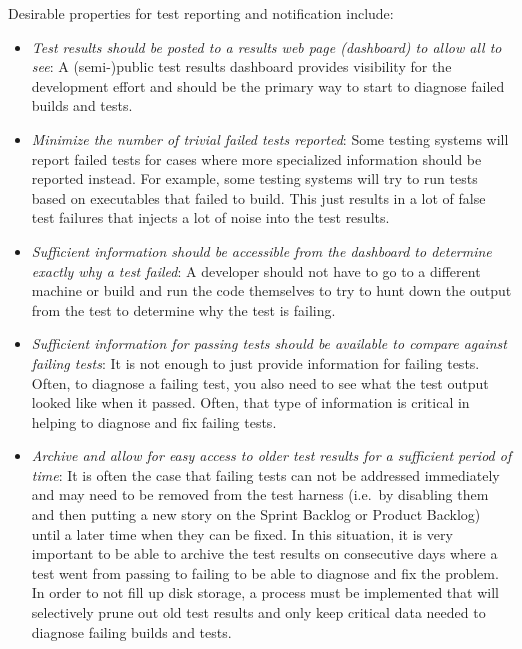\documentclass[pdf,ps2pdf,11pt]{SANDreport}
\begin{document}
Desirable properties for test reporting and notification include:

\begin{itemize}

{}\item\textit{Test results should be posted to a results web page
(dashboard) to allow all to see}: A (semi-)public test results
dashboard provides visibility for the development effort and should be
the primary way to start to diagnose failed builds and tests.

{}\item\textit{Minimize the number of trivial failed tests reported}:
Some testing systems will report failed tests for cases where more
specialized information should be reported instead.  For example, some
testing systems will try to run tests based on executables that failed
to build.  This just results in a lot of false test failures that
injects a lot of noise into the test results.

{}\item\textit{Sufficient information should be accessible from the
dashboard to determine exactly why a test failed}: A developer should
not have to go to a different machine or build and run the code
themselves to try to hunt down the output from the test to determine
why the test is failing.

{}\item\textit{Sufficient information for passing tests should be
available to compare against failing tests}: It is not enough to just
provide information for failing tests.  Often, to diagnose a failing
test, you also need to see what the test output looked like when it
passed.  Often, that type of information is critical in helping to
diagnose and fix failing tests.

{}\item\textit{Archive and allow for easy access to older test results
for a sufficient period of time}: It is often the case that failing
tests can not be addressed immediately and may need to be removed from
the test harness (i.e.\ by disabling them and then putting a new story
on the Sprint Backlog or Product Backlog) until a later time when they
can be fixed.  In this situation, it is very important to be able to
archive the test results on consecutive days where a test went from
passing to failing to be able to diagnose and fix the problem.  In
order to not fill up disk storage, a process must be implemented that
will selectively prune out old test results and only keep critical
data needed to diagnose failing builds and tests.


\end{itemize}
\end{document}
